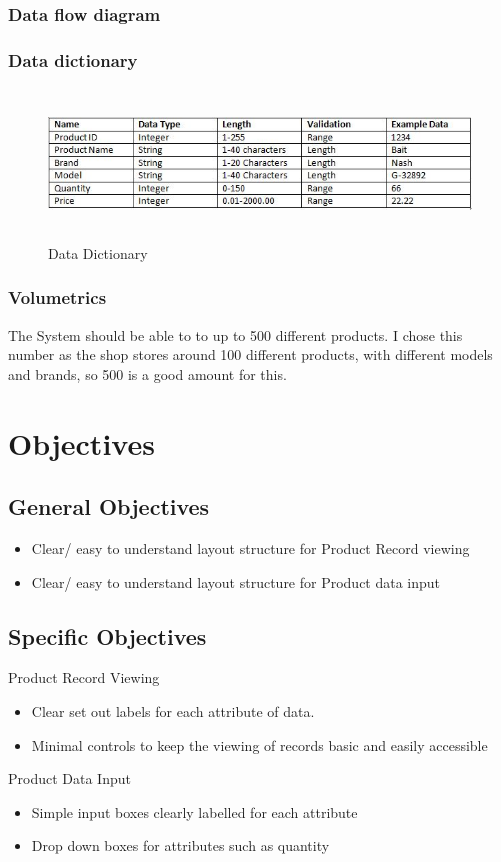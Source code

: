 \subsubsection{Data flow diagram}

\subsubsection{Data dictionary}
\begin{figure}[H]
	\centering
	\includegraphics[width= 15cm, height = 4cm]{Analysis/images/data_dictionary.JPG}
	\caption {Data Dictionary} \label{fig:data_dictionary}
\end{figure}

\subsubsection{Volumetrics}
The System should be able to to up to 500 different products. I chose this number as the shop stores around 100 different products, with different models and brands, so 500 is a good amount for this.
\section{Objectives}

\subsection{General Objectives}
\begin{itemize}
	\item Clear/ easy to understand layout structure for Product Record viewing
	\item Clear/ easy to understand layout structure for Product data input
\end{itemize}
\subsection{Specific Objectives}
Product Record Viewing
\begin{itemize}
	\item Clear set out labels for each attribute of data.
	\item Minimal controls to keep the viewing of records basic and easily accessible
\end{itemize}
Product Data Input
\begin{itemize}
	\item Simple input boxes clearly labelled for each attribute
	\item Drop down boxes for attributes such as quantity
\end{itemize}
